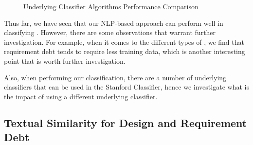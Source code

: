 \begin{figure}[!thb]
  \centering
  \caption{Underlying Classifier Algorithms Performance Comparison}
  \label{fig:algorithms_comparison}
\end{figure}

Thus far, we have seen that our NLP-based approach can perform well in classifying \SATD. However, there are some observations that warrant further investigation. For example, when it comes to the different types of \SATD, we find that requirement debt tends to require less training data, which is another interesting point that is worth further investigation. 


Also, when performing our classification, there are a number of underlying classifiers that can be used in the Stanford Classifier, hence we investigate what is the impact of using a different underlying classifier. 


\subsection{Textual Similarity for Design and Requirement Debt}

